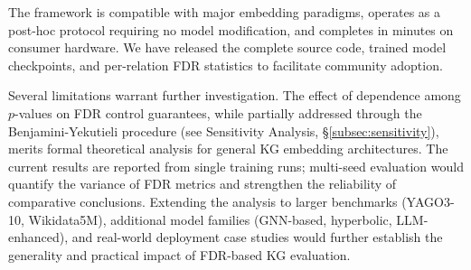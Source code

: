 The framework is compatible with major embedding paradigms, operates as a post-hoc protocol requiring no model modification, and completes in minutes on consumer hardware.
We have released the complete source code, trained model checkpoints, and per-relation FDR statistics to facilitate community adoption.

Several limitations warrant further investigation.
The effect of dependence among $p$-values on FDR control guarantees, while partially addressed through the Benjamini-Yekutieli procedure (see Sensitivity Analysis, \S\ref{subsec:sensitivity}), merits formal theoretical analysis for general KG embedding architectures.
The current results are reported from single training runs; multi-seed evaluation would quantify the variance of FDR metrics and strengthen the reliability of comparative conclusions.
Extending the analysis to larger benchmarks (YAGO3-10, Wikidata5M), additional model families (GNN-based, hyperbolic, LLM-enhanced), and real-world deployment case studies would further establish the generality and practical impact of FDR-based KG evaluation.

